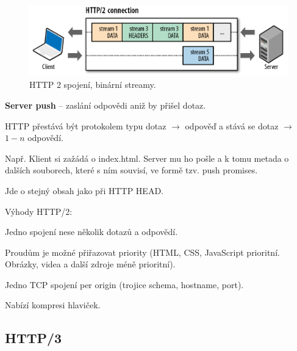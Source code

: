 \begin{compactitem}
    \begin{figure}[H]
        \centering
        \includegraphics[width=1\linewidth]{http2_stream.png}
        \caption{HTTP 2 spojení, binární streamy.}
    \end{figure}

    \item \textbf{Server push} -- zaslání odpovědi aniž by přišel dotaz. \begin{compactitem}
        \item HTTP přestává být protokolem typu dotaz $\rightarrow$ odpověď a stává se dotaz $\rightarrow$ $1-n$ odpovědí.
        \item Např. Klient si zažádá o index.html. Server mu ho pošle a k tomu metada o dalších souborech, které s ním souvisí, ve formě tzv. push promises. \begin{compactitem}
            \item Jde o stejný obsah jako při HTTP HEAD.
        \end{compactitem}
    \end{compactitem}

    \item Výhody HTTP/2: \begin{compactitem}
        \item Jedno spojení nese několik dotazů a odpovědí.
        \item Proudům je možné přiřazovat priority (HTML, CSS, JavaScript prioritní. Obrázky, videa a další zdroje méně prioritní).
        \item Jedno TCP spojení per origin (trojice schema, hostname, port).
        \item Nabízí kompresi hlaviček.
    \end{compactitem}
\end{compactitem}

\subsection{HTTP/3}

